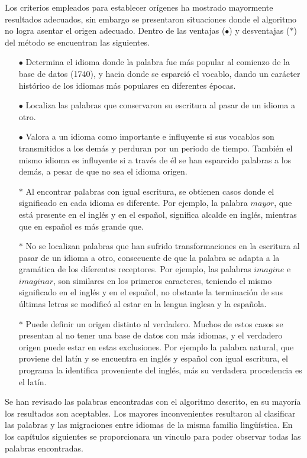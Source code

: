 Los criterios empleados para establecer orígenes ha mostrado mayormente
resultados adecuados, sin embargo se presentaron situaciones donde el algoritmo
no logra asentar el origen adecuado. Dentro de las ventajas ($\bullet$) y
desventajas ($\ast$) del método se encuentran las siguientes. 
\begin{itemize}
\item [$\bullet$] 
Determina el idioma donde la palabra fue más popular al comienzo de
la base de datos (1740), y hacia donde se esparció el vocablo, dando un
carácter histórico de los idiomas más populares en diferentes épocas. 
\item [$\bullet$] 
Localiza las palabras que conservaron su escritura al pasar de un
idioma a otro. 
\item [$\bullet$] 
Valora a un idioma como importante e influyente si sus vocablos son
transmitidos a los demás y perduran por un periodo de tiempo. También el mismo
idioma es influyente si a través de él se han esparcido palabras a los demás, a
pesar de que no sea el idioma origen. 
\item [$\ast$] Al encontrar palabras con igual escritura, se obtienen casos donde
el significado en cada idioma es diferente.  Por ejemplo, la palabra
$\textit{mayor}$, que está presente en el inglés y en el español,  significa
alcalde en inglés, mientras que en español es más grande que.
\item [$\ast$]
No se localizan palabras que han sufrido transformaciones en la
escritura al pasar de un idioma a otro, consecuente de que la palabra se adapta
a la gramática de los diferentes receptores.  Por ejemplo, las palabras
$\textit{imagine}$ e $\textit{imaginar}$, son similares en los primeros
caracteres, teniendo el mismo significado en el inglés y en el español, no
obstante la terminación de  sus últimas letras se modificó al estar en  la
lengua inglesa y la española. 
\item [$\ast$]
 Puede definir un origen distinto al verdadero.  Muchos de estos casos se
presentan al no tener una base de datos con más idiomas, y el verdadero origen
puede estar en estas exclusiones. Por ejemplo la palabra natural, que proviene
del latín y se encuentra en inglés y español con igual escritura,  el programa
la identifica proveniente del inglés, más su verdadera procedencia es el latín. 
\end{itemize}

Se han revisado las palabras encontradas con el algoritmo descrito, en su
mayoría los resultados son aceptables. Los mayores inconvenientes resultaron al
clasificar las palabras y las migraciones entre idiomas de la misma familia
lingüística.  En los capítulos siguientes se proporcionara un vinculo para
poder observar todas las palabras encontradas.


